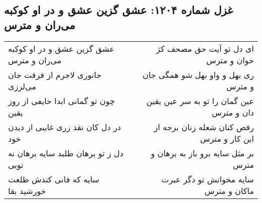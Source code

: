 \begin{center}
\section*{غزل شماره ۱۲۰۴: عشق گزین عشق و در او کوکبه می‌ران و مترس}
\label{sec:1204}
\begin{longtable}{l p{0.5cm} r}
عشق گزین عشق و در او کوکبه می‌ران و مترس
&&
ای دل تو آیت حق مصحف کژ خوان و مترس
\\
جانوری لاجرم از فرقت جان می‌لرزی
&&
ری بهل و واو بهل شو همگی جان و مترس
\\
چون تو گمانی ابدا خایفی از روز یقین
&&
عین گمان را تو به سر عین یقین دان و مترس
\\
در دل کان نقد زری غایبی از دیدن خود
&&
رقص کنان شعله زنان برجه از این کار و مترس
\\
دل ز تو برهان طلبد سایه برهان نه تویی
&&
بر مثل سایه برو باز به برهان و مترس
\\
سایه که فانی کندش طلعت خورشید بقا
&&
سایه مخوانش تو دگر عبرت ماکان و مترس
\\
\end{longtable}
\end{center}
